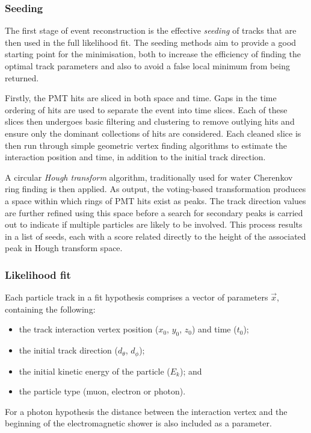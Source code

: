 \subsubsection*{Seeding} %

The first stage of event reconstruction is the effective \emph{seeding} of tracks that are then
used in the full likelihood fit. The seeding methods aim to provide a good starting point for the
minimisation, both to increase the efficiency of finding the optimal track parameters and also to
avoid a false local minimum from being returned.

Firstly, the PMT hits are sliced in both space and time. Gaps in the time ordering of hits are
used to separate the event into time slices. Each of these slices then undergoes basic filtering
and clustering to remove outlying hits and ensure only the dominant collections of hits are
considered. Each cleaned slice is then run through simple geometric vertex finding algorithms to
estimate the interaction position and time, in addition to the initial track direction.

A circular \emph{Hough transform} algorithm, traditionally used for water Cherenkov ring finding
is then applied. As output, the voting-based transformation produces a space within which rings of
PMT hits exist as peaks. The track direction values are further refined using this space before a
search for secondary peaks is carried out to indicate if multiple particles are likely to be
involved. This process results in a list of seeds, each with a score related directly to the
height of the associated peak in Hough transform space.

\subsubsection*{Likelihood fit} %


Each particle track in a fit hypothesis comprises a vector of parameters $\vec{x}$, containing the
following:
\begin{itemize}
    \item the track interaction vertex position ($x_{0}$, $y_{0}$, $z_{0}$) and time ($t_{0}$);
    \item the initial track direction ($d_{\theta}$, $d_{\phi}$);
    \item the initial kinetic energy of the particle ($E_{k}$); and
    \item the particle type (muon, electron or photon).
\end{itemize}
For a photon hypothesis the distance between the interaction vertex and the beginning of the
electromagnetic shower is also included as a parameter.


